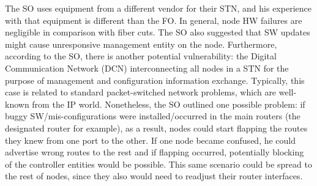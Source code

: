 \documentclass[10pt,draftclsnofoot,onecolumn,journal]{IEEEtran}
\begin{document}
The SO uses equipment from a different vendor for their STN, and his experience with that equipment is different than the FO. In general, node HW failures are negligible in comparison with fiber cuts. The SO also suggested that SW updates might cause unresponsive management entity on the node. Furthermore, according to the SO, there is another potential vulnerability: the Digital Communication Network (DCN) interconnecting all nodes in a STN for the purpose of management and configuration information exchange. Typically, this case is related to standard packet-switched network problems, which are well-known from the IP world. Nonetheless, the SO outlined one possible problem: if buggy SW/mis-configurations were installed/occurred in the main routers (the designated router for example), as a result, nodes could start flapping the routes they knew from one port to the other. If one node became confused, he could advertise wrong routes to the rest and if flapping occurred, potentially blocking of the controller entities would be possible. This same scenario could be spread to the rest of nodes, since they also would need to readjust their router interfaces.
\end{document}
